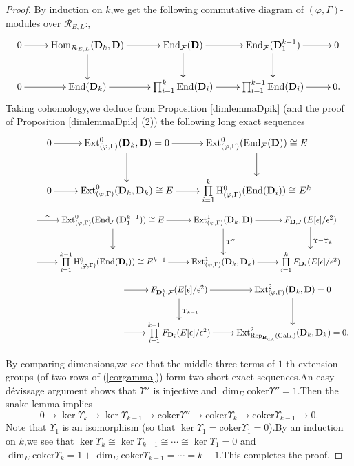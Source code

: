 \documentclass[SecEq,CM,GP]{degruyter-crelle} %
\theoremstyle{plain}
\newcommand{\dr}{{\rm dR}}
\newcommand{\Dpik}{{\mathbf{D}}}
\newcommand{\EndO}{{\rm End}}
\newcommand{\ext}{{\rm Ext}}
\newcommand{\gal}{{\rm Gal}}
\newcommand{\homo}{{\rm Hom}}
\newcommand{\hH}{{\mathrm{H}}}
\newcommand{\Rep}{\mathrm{Rep}}
\newcommand{\bB}{{\mathbf{B}}}
\newcommand{\cR}{\mathcal R}
\newcommand{\cF}{\mathcal F}
\begin{document}
\begin{proof}By induction on $k$,\;we get the following commutative diagram of $(\varphi,\Gamma)$-modules over $\cR_{E,L}$:,\;
\[\xymatrix{0 \ar[r] & \homo_{\cR_{E,L}}(\Dpik_k,\Dpik)\ar[r] \ar[d] & \EndO_{\cF}(\Dpik)\ar[r] \ar[d] & \EndO_{\cF}(\Dpik^{k-1}_1) \ar[r]\ar[d]  &0\\
	0 \ar[r] & \EndO(\Dpik_k) \ar[r] & \prod_{i=1}^k\EndO(\Dpik_i)  \ar[r] & \prod_{i=1}^{k-1}\EndO(\Dpik_i) \ar[r] & 0  .}\]
Taking cohomology,\;we deduce from Proposition \ref{dimlemmaDpik} (and the proof of Proposition \ref{dimlemmaDpik}  (2)) the following long exact sequences
\[\xymatrix{ 
	0 \ar[r] & \ext^0_{(\varphi,\Gamma)}(\Dpik_k,\Dpik)=0 \ar[r] \ar[d] &  	\ext^0_{(\varphi,\Gamma)}(\EndO_{\cF}(\Dpik))\cong E \ar[d]   \\
	0 \ar[r] & \ext^0_{(\varphi,\Gamma)}(\Dpik_k,\Dpik_k)\cong E \ar[r] & \prod\limits_{i=1}^{k}\hH^0_{(\varphi,\Gamma)}( \EndO(\Dpik_i))\cong E^{k} }\]
\begin{equation}\label{corgamma}
	\begin{aligned}
		&\hspace{30pt}\xymatrix{ 
			\ar[r]^{\sim\hspace{60pt}} &\ext^0_{(\varphi,\Gamma)}(\EndO_{\cF}(\Dpik^{k-1}_1))\cong E \ar[r] \ar[d] &  \ext^1_{(\varphi,\Gamma)}(\Dpik_k,\Dpik) \ar[d]^{\Upsilon''}  \ar[r] &  F_{\Dpik,\cF}(E[\epsilon]/\epsilon^2) \ar[d]^{\Upsilon=\Upsilon_k}  \\
			\ar[r] &\prod\limits_{i=1}^{k-1}\hH^0_{(\varphi,\Gamma)}( \EndO(\Dpik_i))\cong E^{k-1} \ar[r] & \ext^1_{(\varphi,\Gamma)}(\Dpik_k,\Dpik_k) \ar[r] & \prod\limits_{i=1}^{k}F_{\Dpik_i}(E[\epsilon]/\epsilon^2)  }
	\end{aligned}
\end{equation}	
\[\hspace{130pt}\xymatrix{
	\ar[r]& F_{\Dpik^k_1,\cF}(E[\epsilon]/\epsilon^2) \ar[r] \ar[d]^{\Upsilon_{k-1}} &  \ext^2_{(\varphi,\Gamma)}(\Dpik_k,\Dpik)=0 \ar[d]  \\
	\ar[r]&\prod\limits_{i=1}^{k-1}F_{\Dpik_i}(E[\epsilon]/\epsilon^2) \ar[r] & \ext^2_{\Rep_{\bB_{\dr}}(\gal_L)}(\Dpik_k,\Dpik_k)=0 .}\]

By comparing dimensions,\;we see that the middle three terms of $1$-th extension groups (of two rows of (\ref{corgamma})) form two short exact sequences.\;An easy d\'{e}vissage argument shows that $\Upsilon''$ is injective and $\dim_E\mathrm{coker}\Upsilon''=1$.\;Then the snake lemma implies 
\[0\rightarrow \ker\Upsilon_k \rightarrow \ker\Upsilon_{k-1}\rightarrow \mathrm{coker}\Upsilon''\rightarrow \mathrm{coker}\Upsilon_k \rightarrow \mathrm{coker}\Upsilon_{k-1}\rightarrow 0.\]
Note that $\Upsilon_1$ is an isomorphism (so that $\ker\Upsilon_1=\mathrm{coker}\Upsilon_1=0$).\;By an induction on $k$,\;we see that $\ker\Upsilon_k\cong \ker\Upsilon_{k-1}\cong\cdots\cong \ker\Upsilon_1=0$ and $\dim_E\mathrm{coker}\Upsilon_k=1+\dim_E\mathrm{coker}\Upsilon_{k-1}=\cdots=k-1$.\;This completes the proof.\;
\end{proof}
\end{document}
